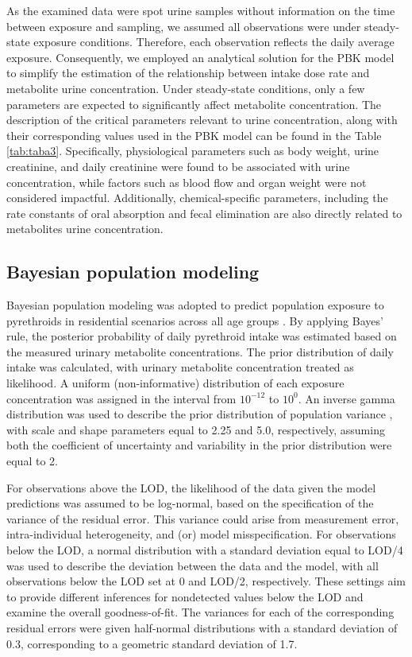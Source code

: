 \documentclass[toxics,article,submit,pdftex,moreauthors]{Definitions/mdpi}
\begin{document}
As the examined data were spot urine samples without information on the
time between exposure and sampling, we assumed all observations were
under steady-state exposure conditions. Therefore, each observation
reflects the daily average exposure. Consequently, we employed an
analytical solution for the PBK model to simplify the estimation of the
relationship between intake dose rate and metabolite urine
concentration. Under steady-state conditions, only a few parameters are
expected to significantly affect metabolite concentration. The
description of the critical parameters relevant to urine concentration,
along with their corresponding values used in the PBK model can be found in
the Table \ref{tab:taba3}. Specifically, physiological parameters such
as body weight, urine creatinine, and daily creatinine were found to be
associated with urine concentration, while factors such as blood flow
and organ weight were not considered impactful. Additionally,
chemical-specific parameters, including the rate constants of oral
absorption and fecal elimination are also directly related to
metabolites urine concentration.

\subsection{Bayesian population
modeling}\label{bayesian-population-modeling}

Bayesian population modeling was adopted to predict population exposure
to pyrethroids in residential scenarios across all age groups
\citep{allen2007use, lyons2008computational}. By applying Bayes' rule,
the posterior probability of daily pyrethroid intake was estimated based
on the measured urinary metabolite concentrations. The prior
distribution of daily intake was calculated, with urinary metabolite
concentration treated as likelihood. A uniform (non-informative)
distribution of each exposure concentration was assigned in the interval
from \(10^{-12}\) to \(10^0\). An inverse gamma distribution was used to
describe the prior distribution of population variance
\citep{lyons2008computational}, with scale and shape parameters equal to
2.25 and 5.0, respectively, assuming both the coefficient of uncertainty
and variability in the prior distribution were equal to 2.

For observations above the LOD, the likelihood of the data given the
model predictions was assumed to be log-normal, based on the
specification of the variance of the residual error. This variance could
arise from measurement error, intra-individual heterogeneity, and (or)
model misspecification. For observations below the LOD, a normal
distribution with a standard deviation equal to LOD/4 was used to
describe the deviation between the data and the model, with all
observations below the LOD set at 0 and LOD/2, respectively. These
settings aim to provide different inferences for nondetected values
below the LOD and examine the overall goodness-of-fit. The variances for
each of the corresponding residual errors were given half-normal
distributions with a standard deviation of 0.3, corresponding to a
geometric standard deviation of 1.7.
\end{document}
